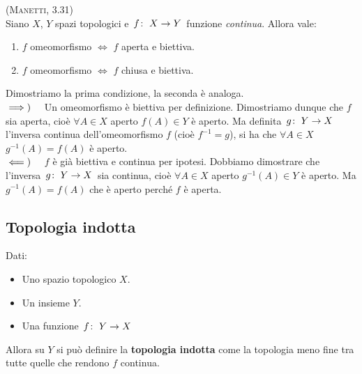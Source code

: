 \begin{lemming}\textsc{(Manetti, 3.31)}\\
	Siano $X$, $Y$ spazi topologici e $\funz{f}{X}{Y}$ funzione \textit{continua}. Allora vale:
	\begin{enumerate}
		\item $f$ omeomorfismo $\iff$ $f$ aperta e biettiva.
		\item $f$ omeomorfismo $\iff$ $f$ chiusa e biettiva.
	\end{enumerate}
\end{lemming}
\begin{demonstration}
	Dimostriamo la prima condizione, la seconda è analoga.\\
	$\implies)\quad$ Un omeomorfismo è biettiva per definizione. Dimostriamo dunque che $f$ sia aperta, cioè $\forall A\in X$ aperto $f\left(A\right)\in Y$ è aperto. Ma definita $\funz{g}{Y}{X}$ l'inversa continua dell'omeomorfismo $f$ (cioè $f^{-1}=g$), si ha che $\forall A\in X$ $g^{-1}\left(A\right)=f\left(A\right)$ è aperto.\\
	$\impliedby)\quad$ $f$ è già biettiva e continua per ipotesi. Dobbiamo dimostrare che l'inversa $\funz{g}{Y}{X}$ sia continua, cioè $\forall A\in X$ aperto $g^{-1}\left(A\right)\in Y$ è aperto. Ma $g^{-1}\left(A\right)=f\left(A\right)$ che è aperto perché $f$ è aperta.
\end{demonstration}
\subsection{Topologia indotta}
\begin{define}
	Dati:
	\begin{itemize}
		\item Uno spazio topologico $X$.
		\item Un insieme $Y$.
		\item Una funzione $\funz{f}{Y}{X}$
	\end{itemize}
	Allora su $Y$ si può definire la \textbf{topologia indotta} come la topologia meno fine tra tutte quelle che rendono $f$ continua.
\end{define}
